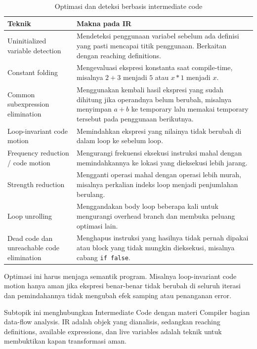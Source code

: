 \begin{table}[H]
\centering
\begin{tabularx}{\textwidth}{|L{0.30\textwidth}|X|}
\hline
\textbf{Teknik} & \textbf{Makna pada IR} \\
\hline
Uninitialized variable detection & Mendeteksi penggunaan variabel sebelum ada definisi yang pasti mencapai titik penggunaan. Berkaitan dengan reaching definitions. \\
\hline
Constant folding & Mengevaluasi ekspresi konstanta saat compile-time, misalnya $2+3$ menjadi $5$ atau $x*1$ menjadi $x$. \\
\hline
Common subexpression elimination & Menggunakan kembali hasil ekspresi yang sudah dihitung jika operandnya belum berubah, misalnya menyimpan $a+b$ ke temporary lalu memakai temporary tersebut pada penggunaan berikutnya. \\
\hline
Loop-invariant code motion & Memindahkan ekspresi yang nilainya tidak berubah di dalam loop ke sebelum loop. \\
\hline
Frequency reduction / code motion & Mengurangi frekuensi eksekusi instruksi mahal dengan memindahkannya ke lokasi yang dieksekusi lebih jarang. \\
\hline
Strength reduction & Mengganti operasi mahal dengan operasi lebih murah, misalnya perkalian indeks loop menjadi penjumlahan berulang. \\
\hline
Loop unrolling & Menggandakan body loop beberapa kali untuk mengurangi overhead branch dan membuka peluang optimasi lain. \\
\hline
Dead code dan unreachable code elimination & Menghapus instruksi yang hasilnya tidak pernah dipakai atau block yang tidak mungkin dieksekusi, misalnya cabang \texttt{if false}. \\
\hline
\end{tabularx}
\caption{Optimasi dan deteksi berbasis intermediate code}
\label{tab:optimasi-ir-tambahan}
\end{table}

Optimasi ini harus menjaga semantik program. Misalnya loop-invariant code motion hanya aman jika ekspresi benar-benar tidak berubah di seluruh iterasi dan pemindahannya tidak mengubah efek samping atau penanganan error.

Subtopik ini menghubungkan Intermediate Code dengan materi Compiler bagian data-flow analysis. IR adalah objek yang dianalisis, sedangkan reaching definitions, available expressions, dan live variables adalah teknik untuk membuktikan kapan transformasi aman.

